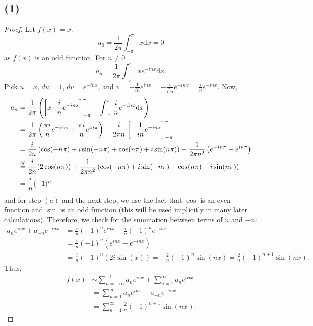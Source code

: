 \documentclass{article}
\newcommand\numeq[1]%
  {\stackrel{\scriptscriptstyle(\mkern-1.5mu#1\mkern-1.5mu)}{=}}
\begin{document}
\subsection*{(1)}
\begin{proof}
Let $f(x) = x$. 
\[
 a_0 = \frac{1}{2 \pi} \int_{-\pi}^{\pi} x \mathrm{d}x = 0 
\]
as $f(x)$ is an odd function. For $n \neq 0$
\[
a_n = \frac{1}{2 \pi}\int_{-\pi}^{\pi} xe^{-inx}\mathrm{d}x.
\]
Pick $u = x$, $du = 1$, $dv = e^{-inx}$, and $v = -\frac{1}{in}e^{inx} = -\frac{i}{i^2n}e^{-inx} = \frac{i}{n}e^{-inx}$. Now, 
\begin{align*}
  a_n &= \frac{1}{2 \pi}\left(\left[x \cdot \frac{i}{n}e^{-inx}\right]_{-\pi}^{\pi} - \int_{-\pi}^{\pi}\frac{i}{n}e^{-inx}\mathrm{d}x \right) \\
  &= \frac{1}{2 \pi}\left(\frac{\pi i }{n}e^{-in \pi} + \frac{\pi i}{n}e^{in \pi} \right) - \frac{i}{2 \pi n} \left[-\frac{1}{in}e^{-inx} \right]_{-\pi}^{\pi} \\
  &= \frac{i}{2n}\left(\cos(-n \pi) + i \sin(-n\pi) + \cos(n \pi) + i \sin(n \pi)\right) + \frac{1}{2\pi n^2}\left(e^{-in \pi} - e^{in \pi} \right) \\
  & \numeq{a}\frac{i}{2n}(2 \cos(n \pi)) + \frac{1}{2 \pi n^2}\left(\cos(-n \pi) + i \sin(-n\pi) - \cos(n \pi) - i \sin(n \pi)\right) \\
  & =\frac{i}{n}(-1)^n
\end{align*}
and for step $(a)$ and the next step, we use the fact that $\cos$ is an even function and $\sin$ is an odd function (this will be used implicitly in many later calculations). Therefore, we check for the summation between terms of $n$ and $-n$:
\begin{align*}
  a_ne^{inx} + a_{-n}e^{-inx} &= \frac{i}{n}(-1)^ne^{inx} - \frac{i}{n}(-1)^ne^{-inx} \\
  &= \frac{i}{n}(-1)^n \left(e^{inx} - e^{-inx} \right) \\
  &= \frac{i}{n}(-1)^n(2i \sin(x)) = -\frac{2}{n}(-1)^n\sin(nx) = \frac{2}{n}(-1)^{n + 1}\sin(nx). 
\end{align*}
Thus, 
\begin{align*}
  f(x) &\sim \sum\limits_{n = -\infty}^{-1}a_ne^{inx} + \sum\limits_{n = 1}^{\infty}a_ne^{inx} \\
  &= \sum\limits_{n = 1}^{\infty}a_ne^{inx} + a_{-n}e^{-inx} \\
  &= \sum\limits_{n = 1}^{\infty}\frac{2}{n}(-1)^{n + 1}\sin(nx).
\end{align*}
\end{proof}
\end{document}
